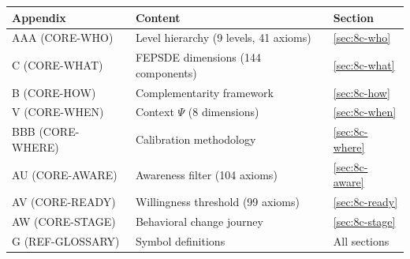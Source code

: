 \begin{tcolorbox}[
    colback=yellow!10!white,
    colframe=orange!75!black,
    title={\textbf{Appendix References for This Chapter}},
    fonttitle=\bfseries
]
\small
\begin{tabular}{@{}p{3.2cm}p{5.2cm}p{3.8cm}@{}}
\textbf{Appendix} & \textbf{Content} & \textbf{Section} \\
\midrule
AAA (CORE-WHO) & Level hierarchy (9 levels, 41 axioms) & \ref{sec:8c-who} \\
C (CORE-WHAT) & FEPSDE dimensions (144 components) & \ref{sec:8c-what} \\
B (CORE-HOW) & Complementarity framework & \ref{sec:8c-how} \\
V (CORE-WHEN) & Context $\Psi$ (8 dimensions) & \ref{sec:8c-when} \\
BBB (CORE-WHERE) & Calibration methodology & \ref{sec:8c-where} \\
AU (CORE-AWARE) & Awareness filter (104 axioms) & \ref{sec:8c-aware} \\
AV (CORE-READY) & Willingness threshold (99 axioms) & \ref{sec:8c-ready} \\
AW (CORE-STAGE) & Behavioral change journey & \ref{sec:8c-stage} \\
G (REF-GLOSSARY) & Symbol definitions & All sections
\end{tabular}
\end{tcolorbox}

